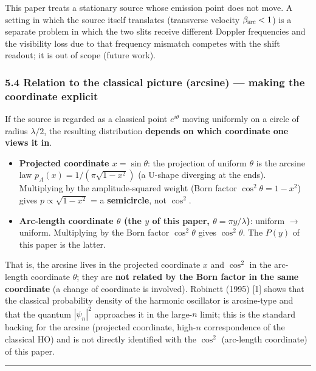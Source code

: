 \documentclass[
]{article}
\providecommand{\tightlist}{%
  \setlength{\itemsep}{0pt}\setlength{\parskip}{0pt}}
\begin{document}
This paper treats a stationary source whose emission point does not
move. A setting in which the source itself translates (transverse
velocity \(\beta_{\rm src}<1\)) is a separate problem in which the two
slits receive different Doppler frequencies and the visibility loss due
to that frequency mismatch competes with the shift readout; it is out of
scope (future work).

\subsubsection{5.4 Relation to the classical picture (arcsine) ---
making the coordinate
explicit}\label{relation-to-the-classical-picture-arcsine-making-the-coordinate-explicit}

If the source is regarded as a classical point \(e^{i\theta}\) moving
uniformly on a circle of radius \(\lambda/2\), the resulting
distribution \textbf{depends on which coordinate one views it in}.

\begin{itemize}
\tightlist
\item
  \textbf{Projected coordinate \(x=\sin\theta\)}: the projection of
  uniform \(\theta\) is the arcsine law \(p_A(x)=1/(\pi\sqrt{1-x^2})\)
  (a U-shape diverging at the ends). Multiplying by the
  amplitude-squared weight (Born factor \(\cos^2\theta=1-x^2\)) gives
  \(p\propto\sqrt{1-x^2}\) = a \textbf{semicircle}, not \(\cos^2\).
\item
  \textbf{Arc-length coordinate \(\theta\) (the \(y\) of this paper,
  \(\theta=\pi y/\lambda\))}: uniform \(\to\) uniform. Multiplying by
  the Born factor \(\cos^2\theta\) gives \(\cos^2\theta\). The \(P(y)\)
  of this paper is the latter.
\end{itemize}

That is, the arcsine lives in the projected coordinate \(x\) and
\(\cos^2\) in the arc-length coordinate \(\theta\); they are \textbf{not
related by the Born factor in the same coordinate} (a change of
coordinate is involved). Robinett (1995) {[}1{]} shows that the
classical probability density of the harmonic oscillator is arcsine-type
and that the quantum \(|\psi_n|^2\) approaches it in the large-\(n\)
limit; this is the standard backing for the arcsine (projected
coordinate, high-\(n\) correspondence of the classical HO) and is not
directly identified with the \(\cos^2\) (arc-length coordinate) of this
paper.

\begin{center}\rule{0.5\linewidth}{0.5pt}\end{center}
\end{document}
